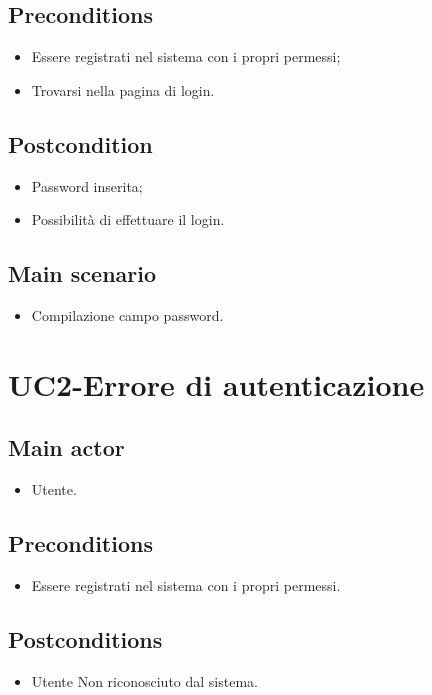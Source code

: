 \documentclass{article}
\begin{document}
     \subsection*{Preconditions} 
        \begin{itemize}
            \item Essere registrati nel sistema con i propri permessi;
            \item Trovarsi nella pagina di login.
        \end{itemize}
        \subsection*{Postcondition} 
        \begin{itemize}
            \item Password inserita;
            \item Possibilità di effettuare il login.
        \end{itemize}
         \subsection*{Main scenario}
        \begin{itemize}
        \item Compilazione campo password.
        \end{itemize}

\section{UC2-Errore di autenticazione}
    
     \subsection*{Main actor}
         \begin{itemize}
             \item Utente.
         \end{itemize}
     \subsection*{Preconditions} 
        \begin{itemize}
            \item Essere registrati nel sistema con i propri permessi.
        \end{itemize}
               
    \subsection*{Postconditions}
        \begin{itemize}
            \item Utente Non riconosciuto dal sistema.
        \end{itemize}
\end{document}

